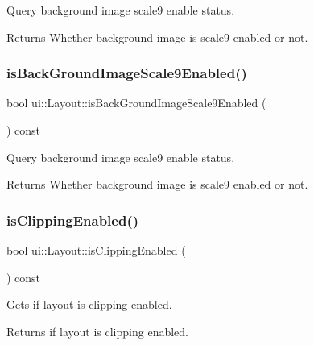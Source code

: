 Query background image scale9 enable status. \begin{DoxyReturn}{Returns}
Whether background image is scale9 enabled or not. 
\end{DoxyReturn}
\mbox{\label{classui_1_1Layout_afcf5c9d16219499c4dacedc2704972af}} 
\subsubsection{\texorpdfstring{is\+Back\+Ground\+Image\+Scale9\+Enabled()}{isBackGroundImageScale9Enabled()}\hspace{0.1cm}{\footnotesize\ttfamily [2/2]}}
{\footnotesize\ttfamily bool ui\+::\+Layout\+::is\+Back\+Ground\+Image\+Scale9\+Enabled (\begin{DoxyParamCaption}{ }\end{DoxyParamCaption}) const}

Query background image scale9 enable status. \begin{DoxyReturn}{Returns}
Whether background image is scale9 enabled or not. 
\end{DoxyReturn}
\mbox{\label{classui_1_1Layout_a7a0a9ff2d476cbf3067e737c6ec3e18f}} 
\subsubsection{\texorpdfstring{is\+Clipping\+Enabled()}{isClippingEnabled()}\hspace{0.1cm}{\footnotesize\ttfamily [1/2]}}
{\footnotesize\ttfamily bool ui\+::\+Layout\+::is\+Clipping\+Enabled (\begin{DoxyParamCaption}{ }\end{DoxyParamCaption}) const\hspace{0.3cm}{\ttfamily [virtual]}}

Gets if layout is clipping enabled.

\begin{DoxyReturn}{Returns}
if layout is clipping enabled. 
\end{DoxyReturn}
\mbox{\label{classui_1_1Layout_a6c82db84c36bfb19462616bc2a691e5c}} 
